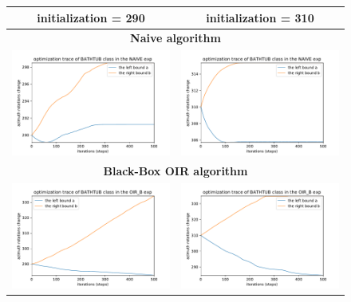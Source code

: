 \begin{figure}[h]
\centering
\tabcolsep=0.03cm
   \begin{tabular}{c|c}  \hline
   \textbf{initialization = 290} & \textbf{initialization = 310} \\  \hline
      \multicolumn{2}{c}{\textbf{Naive algorithm}} \\   
\includegraphics[width = 9cm]{supimages/converge/run2_1_1_naive.pdf} &
\includegraphics[width = 9cm]{supimages/converge/run3_1_1_naive.pdf} \\   \hline
\multicolumn{2}{c}{\textbf{Black-Box OIR algorithm}} \\  
\includegraphics[width = 9cm]{supimages/converge/run2_1_1_OIR_B.pdf} &
\includegraphics[width = 9cm]{supimages/converge/run3_1_1_OIR_B.pdf} \\   \hline

\end{tabular}
\end{figure}
